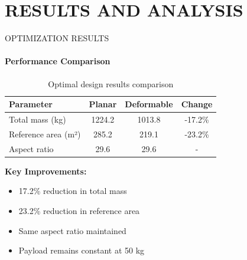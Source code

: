 \documentclass{beamer}
\begin{document}
\section{RESULTS AND ANALYSIS}
\begin{frame}{OPTIMIZATION RESULTS}
    \framesubtitle{Performance Comparison}
    
    \begin{table}
        \centering
        \begin{tabular}{|l|c|c|c|}
            \hline
            \textbf{Parameter} & \textbf{Planar} & \textbf{Deformable} & \textbf{Change} \\
            \hline
            Total mass (kg) & 1224.2 & 1013.8 & -17.2\% \\
            Reference area (m²) & 285.2 & 219.1 & -23.2\% \\
            Aspect ratio & 29.6 & 29.6 & - \\
            \hline
        \end{tabular}
        \caption{Optimal design results comparison}
    \end{table}
    
    \textbf{Key Improvements:}
    \begin{itemize}
        \item 17.2\% reduction in total mass
        \item 23.2\% reduction in reference area
        \item Same aspect ratio maintained
        \item Payload remains constant at 50 kg
    \end{itemize}
\end{frame}
\end{document}
